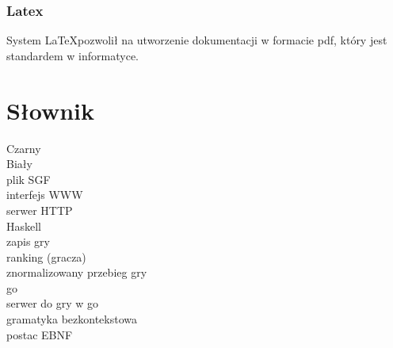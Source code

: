 \documentclass[10pt,leqno]{article}
\begin{document}
\subsubsection{Latex}
System \LaTeX pozwolił na utworzenie dokumentacji w formacie pdf, który jest standardem w informatyce.

\section{Słownik}
Czarny \\
Biały \\
plik SGF \\
interfejs WWW \\
serwer HTTP \\
Haskell \\
zapis gry \\
ranking (gracza) \\
znormalizowany przebieg gry \\
go \\
serwer do gry w go \\
gramatyka bezkontekstowa \\
postac EBNF \\ 

\end{document}
